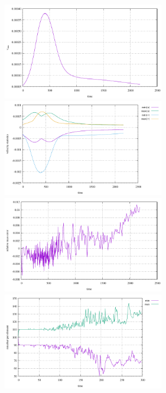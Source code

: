\begin{center}
\includegraphics[width=7cm]{python_codes/fieldstone_67/dripping/vrms.pdf}
\includegraphics[width=7cm]{python_codes/fieldstone_67/dripping/vel.pdf}\\
\includegraphics[width=7cm]{python_codes/fieldstone_67/dripping/mass.pdf}
\includegraphics[width=7cm]{python_codes/fieldstone_67/dripping/nmarker_per_element.pdf}
\end{center}

